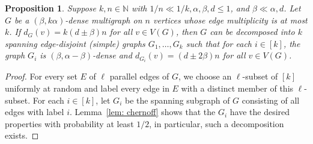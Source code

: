 \documentclass[a4paper, 11pt, reqno]{amsart}
\newtheorem{proposition}[definition]{Proposition}
\numberwithin{equation}{section}
\newcommand{\1}{{\rm 1\hspace*{-0.4ex}%
\rule{0.1ex}{1.52ex}\hspace*{0.2ex}}}
\newcommand{\N}{\mathbb N}
\newcommand{\COMMENT}[1]{}
\begin{document}
\begin{proposition}\label{prop: decomp multigraph}
Suppose $k,n\in \N$ with $1/n\ll 1/k,\alpha, \beta,d \leq 1$, and $\beta \ll \alpha, d$. 
Let $G$ be a $(\beta,k\alpha)$-dense multigraph on $n$ vertices 
whose edge multiplicity is at most $k$.
If $d_{G}(v) = k(d\pm \beta)n$ for all $v\in V(G)$,
then $G$ can be decomposed into $k$ spanning edge-disjoint (simple) graphs $G_1,\ldots, G_k$
such that for each $i\in[k]$, the graph $G_i$ is $(\beta,\alpha -\beta)$-dense and $d_{G_i}(v) = (d\pm 2\beta) n$ for all $v\in V(G)$.
\end{proposition}
\begin{proof}
For every set $E$ of $\ell$ parallel edges of $G$, 
we choose an $\ell$-subset of $[k]$ uniformly at random and label every edge in $E$ with a distinct member of this $\ell$-subset. 
For each $i\in [k]$, 
let $G_i$ be the spanning subgraph of $G$ consisting of all edges with label $i$.
Lemma~\ref{lem: chernoff} shows that the $G_i$ have the desired properties with probability at least $1/2$, in particular, such a decomposition exists.
\COMMENT{ 
Let $c$ be a positive real number such that $c\ll \beta$.
Note that if there are $m(uv)$ edges between $u$ and $v$, then $G_i$ has an edge $uv$ with probability $m(uv)/k$.
Fix $i\in [k]$. For a pair $u,v$, let $X_{uv}=1$ if $uv \in E(G_i)$ and $X_{uv}=0$ otherwise.

Thus for two sets $A,B$ with $|A|,|B|\geq \beta n$ and vertex $u$, 
 $\mathbb{E}[d_{G_i}(u)] = \sum_{v\neq u} m(uv)/k = \frac{d_{G}(u)}{k}$ and $\mathbb{E}[e_{G_i}(A,B)] = \sum_{v\in A, w\in B} m(vw)/k = \frac{e_{G}(A,B)}{k} \geq \alpha|A||B|.$.

Note that $d_{G_i}(u) = \sum_{v\in N_{G}(u)} X_{uv}$ is sum of at least $d_{G}(u)/k \geq d n/2$ independent random variables, and $e_{G_i}(A,B) = \sum_{ v\in A, w\in B} X_{vw}$ is sum of at least $e_{G}(A,B)/(2k) \geq \alpha \beta^2 n^2 /(4k)$ independent random variables.

Thus Lemma~\ref{lem: chernoff} shows that
$$\mathbb{P}[ d_{G_i}(u) = (d\pm 2\beta)n ] \geq 1 - (1-c)^n,$$
and 
$$\mathbb{P}[ e_{G_i}(A,B) \geq  \alpha|A||B| - \beta|A||B|] \geq 1- (1-c)^{n^2}.$$ 
Since there are $n$ vertices and at most $2^{2n}$ pairs $(A,B)$ of sets, union bounds gives that for all $i\in [k]$ $G_i$ is $(\beta,\alpha -\beta)$-dense and $d_{G_i}(v) = (d\pm 2\beta) n$ for all $v\in V(G)$ with probability at least $1 - k n (1-c)^n - k 2^{2n} (1-c)^{n^2} \geq 1/2$. Thus the conclusion holds.
}
\end{proof}
\end{document}
